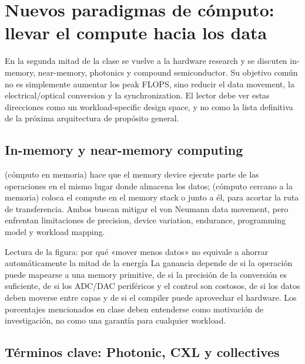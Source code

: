 \section{Nuevos paradigmas de cómputo: llevar el compute hacia los data}

En la segunda mitad de la clase se vuelve a la hardware research y se discuten in-memory, near-memory, photonics y compound semiconductor. Su objetivo común no es simplemente aumentar los peak FLOPS, sino reducir el data movement, la electrical/optical conversion y la synchronization. El lector debe ver estas direcciones como un workload-specific design space, y no como la lista definitiva de la próxima arquitectura de propósito general.

\subsection{In-memory y near-memory computing}

 (cómputo en memoria) hace que el memory device ejecute parte de las operaciones en el mismo lugar donde almacena los datos;  (cómputo cercano a la memoria) coloca el compute en el memory stack o junto a él, para acortar la ruta de transferencia. Ambos buscan mitigar el von Neumann data movement, pero enfrentan limitaciones de precision, device variation, endurance, programming model y workload mapping.


\begin{knowledgebox}{Lectura de la figura: por qué «mover menos datos» no equivale a ahorrar automáticamente la mitad de la energía}
La ganancia depende de si la operación puede mapearse a una memory primitive, de si la precisión de la conversión es suficiente, de si los ADC/DAC periféricos y el control son costosos, de si los datos deben moverse entre capas y de si el compiler puede aprovechar el hardware. Los porcentajes mencionados en clase deben entenderse como motivación de investigación, no como una garantía para cualquier workload.
\end{knowledgebox}

\subsection{Términos clave: Photonic, CXL y collectives}

